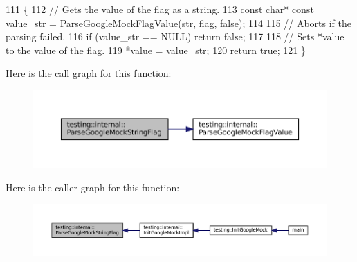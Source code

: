 \begin{DoxyCode}
111                                                      \{
112   \textcolor{comment}{// Gets the value of the flag as a string.}
113   \textcolor{keyword}{const} \textcolor{keywordtype}{char}* \textcolor{keyword}{const} value\_str = \hyperlink{namespacetesting_1_1internal_af9eac3bda47b1fa0b8e43d1d1d3a0b16}{ParseGoogleMockFlagValue}(str, flag, \textcolor{keyword}{false});
114 
115   \textcolor{comment}{// Aborts if the parsing failed.}
116   \textcolor{keywordflow}{if} (value\_str == NULL) \textcolor{keywordflow}{return} \textcolor{keyword}{false};
117 
118   \textcolor{comment}{// Sets *value to the value of the flag.}
119   *value = value\_str;
120   \textcolor{keywordflow}{return} \textcolor{keyword}{true};
121 \}
\end{DoxyCode}
Here is the call graph for this function\+:
\nopagebreak
\begin{figure}[H]
\begin{center}
\leavevmode
\includegraphics[width=350pt]{namespacetesting_1_1internal_afb359266feb817d9943854b76574817d_cgraph}
\end{center}
\end{figure}
Here is the caller graph for this function\+:
\nopagebreak
\begin{figure}[H]
\begin{center}
\leavevmode
\includegraphics[width=350pt]{namespacetesting_1_1internal_afb359266feb817d9943854b76574817d_icgraph}
\end{center}
\end{figure}
\mbox{\label{namespacetesting_1_1internal_afccff08aa2b1ede0dd32c1364a5dee42}} 
